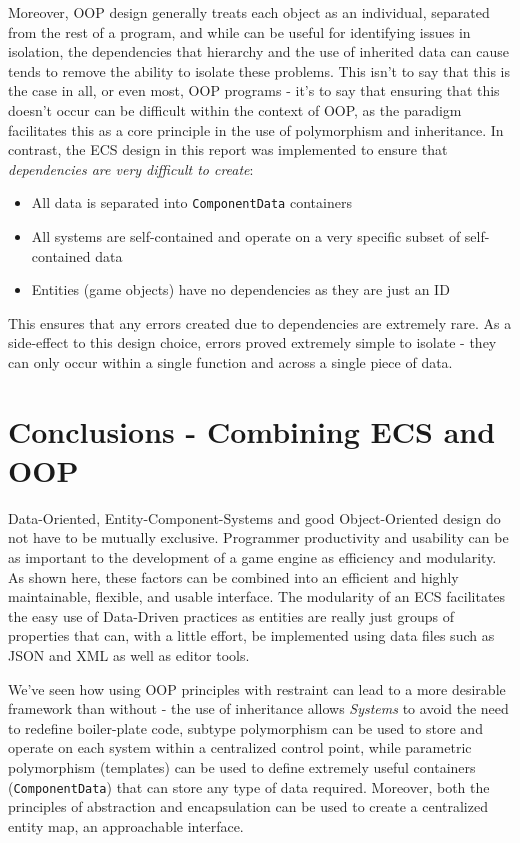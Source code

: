\documentclass[10pt]{scrartcl}
\begin{document}
Moreover, OOP design generally treats each object as an individual, separated from the rest of a program, and while can be useful for identifying issues in isolation, the dependencies that hierarchy and the use of inherited data can cause tends to remove the ability to isolate these problems. This isn't to say that this is the case in all, or even most, OOP programs - it's to say that ensuring that this doesn't occur can be difficult within the context of OOP, as the paradigm facilitates this as a core principle in the use of polymorphism and inheritance. In contrast, the ECS design in this report was implemented to ensure that \textit{dependencies are very difficult to create}:

\begin{itemize}
	\item All data is separated into \texttt{ComponentData} containers
	\item All systems are self-contained and operate on a very specific subset of self-contained data
	\item Entities (game objects) have no dependencies as they are just an ID
\end{itemize}

This ensures that any errors created due to dependencies are extremely rare. As a side-effect to this design choice, errors proved extremely simple to isolate - they can only occur within a single function and across a single piece of data.



\section{Conclusions - Combining ECS and OOP} %
\label{sec:conclusions_combining_ecs_and_oop}
Data-Oriented, Entity-Component-Systems and good Object-Oriented design do not have to be mutually exclusive. Programmer productivity and usability can be as important to the development of a game engine as efficiency and modularity. As shown here, these factors can be combined into an efficient and highly maintainable, flexible, and usable interface. The modularity of an ECS facilitates the easy use of Data-Driven practices as entities are really just groups of properties that can, with a little effort, be implemented using data files such as JSON and XML as well as editor tools.

We've seen how using OOP principles with restraint can lead to a more desirable framework than without - the use of inheritance allows \textit{Systems} to avoid the need to redefine boiler-plate code, subtype polymorphism can be used to store and operate on each system within a centralized control point, while parametric polymorphism (templates) can be used to define extremely useful containers (\texttt{ComponentData}) that can store any type of data required. Moreover, both the principles of abstraction and encapsulation can be used to create a centralized entity map, an approachable interface.
\end{document}
